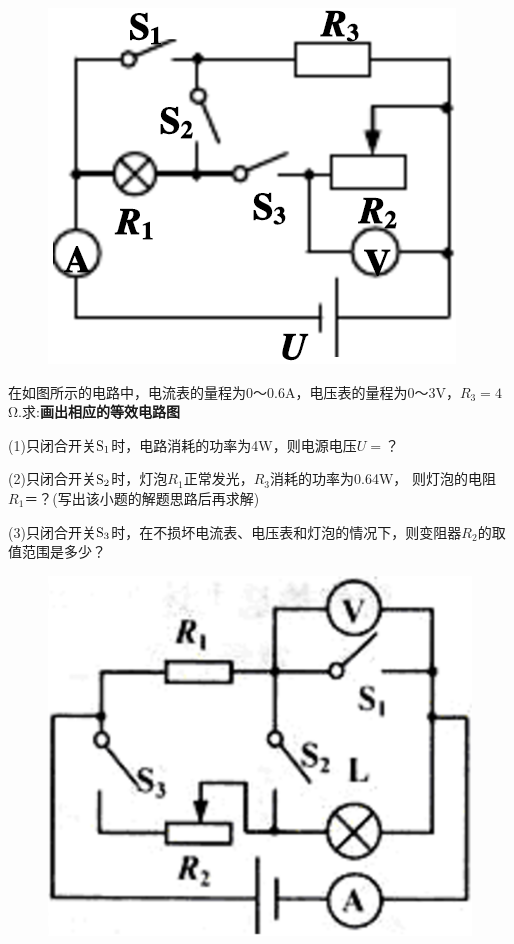\documentclass[11pt,a4paper]{article}
\newcommand{\nianfen}[1]{\hspace{-2em}{(#1\textbf{·}\textit{青岛})}}
\begin{document}
	\begin{figure}
		\includegraphics[width=\linewidth]{2011}
	\end{figure}
	
	\nianfen{2011}在如图所示的电路中，电流表的量程为0～0.6A，电压表的量程为0～3V，$ R_3=4 $Ω.求:\textbf{画出相应的等效电路图}
	
	(1)只闭合开关$\rm S_1 $时，电路消耗的功率为4W，则电源电压$ U= $？
	
	(2)只闭合开关$\rm S_2 $时，灯泡$ R_1 $正常发光，$ R_3 $消耗的功率为0.64W， 则灯泡的电阻$ R_1＝ $？(写出该小题的解题思路后再求解)
	
	(3)只闭合开关$\rm S_3 $时，在不损坏电流表、电压表和灯泡的情况下，则变阻器$ R_2 $的取值范围是多少？
	\clearpage
	
	\begin{figure}
		\includegraphics[width=\linewidth]{2010}
	\end{figure}
\end{document}
